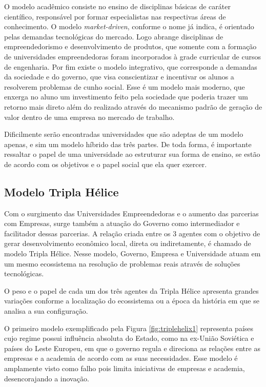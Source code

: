 O modelo acadêmico consiste no ensino de disciplinas básicas de caráter científico, responsável por formar especialistas nas respectivas áreas de conhecimento. O modelo \textit{market-driven}, conforme o nome já indica, é orientado pelas demandas tecnológicas do mercado. Logo abrange disciplinas de empreendedorismo e desenvolvimento de produtos, que somente com a formação de universidades empreendedoras foram incorporados à grade curricular de cursos de engenharia. Por fim existe o modelo integrativo, que corresponde a demandas da sociedade e do governo, que visa conscientizar e incentivar os alunos a resolverem problemas de cunho social. Esse é um modelo mais moderno, que enxerga no aluno um investimento feito pela sociedade que poderia trazer um retorno mais direto além do realizado através do mecanismo padrão de geração de valor dentro de uma empresa no mercado de trabalho. 

Dificilmente serão encontradas universidades que são adeptas de um modelo apenas, e sim um modelo híbrido das três partes. De toda forma, é importante ressaltar o papel de uma universidade ao estruturar sua forma de ensino, se estão de acordo com os objetivos e o papel social que ela quer exercer.

\subsection{Modelo Tripla Hélice}
\label{cha:univ_empreend}

Com o surgimento das Universidades Empreendedoras e o aumento das parcerias com Empresas, surge também a atuação do Governo como intermediador e facilitador dessas parcerias. A relação criada entre os 3 agentes com o objetivo de gerar desenvolvimento econômico local, direta ou indiretamente, é chamado de modelo Tripla Hélice. Nesse modelo, Governo, Empresa e Universidade atuam em um mesmo ecossistema na resolução de problemas reais através de soluções tecnológicas.

O peso e o papel de cada um dos três agentes da Tripla Hélice apresenta grandes variações conforme a localização do ecossistema ou a época da história em que se analisa a sua configuração. \cite{etzkowitz2000}

O primeiro modelo exemplificado pela Figura \ref{fig:triplehelix1} representa países  cujo regime possui influência absoluta do Estado, como na ex-União Soviética e países do Leste Europeu, em que o governo regula e direciona as relações entre as empresas e a academia de acordo com as suas necessidades. Esse modelo é amplamente visto como falho pois limita iniciativas de empresas e academia, desencorajando a inovação.

